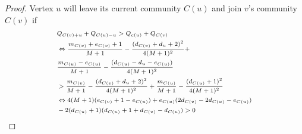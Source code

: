 \begin{proof}
Vertex $u$ will leave its current community $C(u)$ and join $v$'s community $C(v)$ if\\
\[\scriptsize
\begin{split}
& Q_{C(v)+u} + Q_{C(u)-u} > Q_{c(u)} + Q_{C(v)}\\
&\Leftrightarrow \frac{m_{C(v)}+e_{C(v)}+1}{M+1} - \frac{(d_{C(v)}+d_u+2)^2}{4(M+1)^2}+\\
&\frac{m_{C(u)} - e_{C(u)}}{M+1} - \frac{(d_{C(u)}-d_u-e_{C(u)})}{4(M+1)^2} \\
& > \frac{m_{C(v)}}{M+1} - \frac{(d_{C(v)}+d_u+2)^2}{4(M+1)^2} + \frac{m_{C(u)}}{M+1} - \frac{(d_{C(u)}+1)^2}{4(M+1)^2}\\
&\Leftrightarrow 4(M+1)(e_{C(v)} +1 -e_{C(u)}) + e_{C(u)}(2d_{C(v)} - 2d_{C(u)}-e_{C(u)})\\
& - 2(d_{C(u)}+1)(d_{C(u)}+1+d_{C(v)}-d_{C(u)})>0
\end{split}\]
\end{proof}







